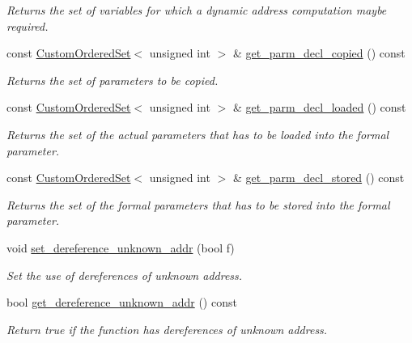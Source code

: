 \begin{DoxyCompactItemize}
\begin{DoxyCompactList}\small\item\em Returns the set of variables for which a dynamic address computation maybe required. \end{DoxyCompactList}\item 
const \hyperlink{classCustomOrderedSet}{Custom\+Ordered\+Set}$<$ unsigned int $>$ \& \hyperlink{classFunctionBehavior_ac629d472b15dbc6c1ccf88a15602edac}{get\+\_\+parm\+\_\+decl\+\_\+copied} () const
\begin{DoxyCompactList}\small\item\em Returns the set of parameters to be copied. \end{DoxyCompactList}\item 
const \hyperlink{classCustomOrderedSet}{Custom\+Ordered\+Set}$<$ unsigned int $>$ \& \hyperlink{classFunctionBehavior_a93a9a59f4fdc831007c3ec616a9ca3a2}{get\+\_\+parm\+\_\+decl\+\_\+loaded} () const
\begin{DoxyCompactList}\small\item\em Returns the set of the actual parameters that has to be loaded into the formal parameter. \end{DoxyCompactList}\item 
const \hyperlink{classCustomOrderedSet}{Custom\+Ordered\+Set}$<$ unsigned int $>$ \& \hyperlink{classFunctionBehavior_add32fdf1e32aab5388fb8326ec0d7916}{get\+\_\+parm\+\_\+decl\+\_\+stored} () const
\begin{DoxyCompactList}\small\item\em Returns the set of the formal parameters that has to be stored into the formal parameter. \end{DoxyCompactList}\item 
void \hyperlink{classFunctionBehavior_afe95c66814779c918b81a91d3c782ebb}{set\+\_\+dereference\+\_\+unknown\+\_\+addr} (bool f)
\begin{DoxyCompactList}\small\item\em Set the use of dereferences of unknown address. \end{DoxyCompactList}\item 
bool \hyperlink{classFunctionBehavior_a03f2a6f7c22f07616ed9de65e8e53d92}{get\+\_\+dereference\+\_\+unknown\+\_\+addr} () const
\begin{DoxyCompactList}\small\item\em Return true if the function has dereferences of unknown address. \end{DoxyCompactList}\item 

\end{DoxyCompactItemize}
